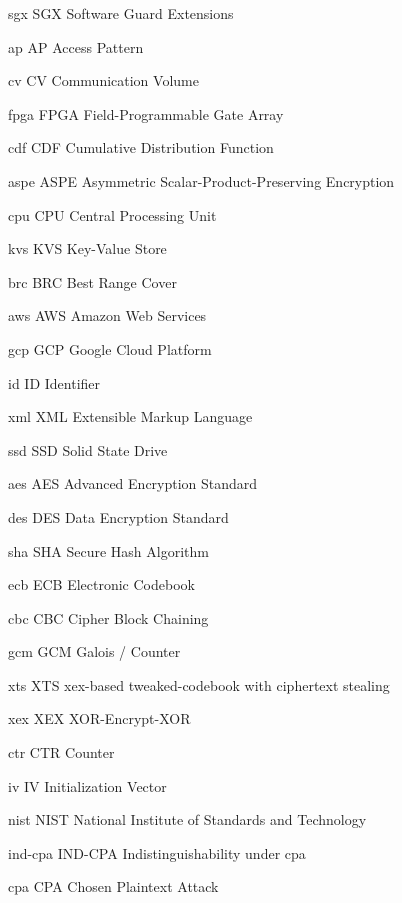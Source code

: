 \newacronym%
	{sgx}
	{SGX}
	{Software Guard Extensions}

\newacronym%
	{ap}
	{AP}
	{Access Pattern}

\newacronym%
	{cv}
	{CV}
	{Communication Volume}

\newacronym%
	{fpga}
	{FPGA}
	{Field-Programmable Gate Array}

\newacronym%
	{cdf}
	{CDF}
	{Cumulative Distribution Function}

\newacronym%
	{aspe}
	{ASPE}
	{Asymmetric Scalar-Product-Preserving Encryption}

\newacronym%
	{cpu}
	{CPU}
	{Central Processing Unit}

\newacronym%
	{kvs}
	{KVS}
	{Key-Value Store}

\newacronym%
	{brc}
	{BRC}
	{Best Range Cover}

\newacronym%
	{aws}
	{AWS}
	{Amazon Web Services}

\newacronym%
	{gcp}
	{GCP}
	{Google Cloud Platform}

\newacronym%
	{id}
	{ID}
	{Identifier}

\newacronym%
	{xml}
	{XML}
	{Extensible Markup Language}

\newacronym%
	{ssd}
	{SSD}
	{Solid State Drive}

\newacronym%
	{aes}
	{AES}
	{Advanced Encryption Standard}

\newacronym%
	{des}
	{DES}
	{Data Encryption Standard}

\newacronym%
	{sha}
	{SHA}
	{Secure Hash Algorithm}

\newacronym%
	{ecb}
	{ECB}
	{Electronic Codebook}

\newacronym%
	{cbc}
	{CBC}
	{Cipher Block Chaining}

\newacronym%
	{gcm}
	{GCM}
	{Galois / Counter}

\newacronym%
	{xts}
	{XTS}
	{\acrshort{xex}-based tweaked-codebook with ciphertext stealing}

\newacronym%
	{xex}
	{XEX}
	{XOR-Encrypt-XOR}

\newacronym%
	{ctr}
	{CTR}
	{Counter}

\newacronym%
	{iv}
	{IV}
	{Initialization Vector}

\newacronym%
	{nist}
	{NIST}
	{National Institute of Standards and Technology}

\newacronym%
	{ind-cpa}
	{IND-CPA}
	{Indistinguishability under \acrlong{cpa}}

\newacronym%
	{cpa}
	{CPA}
	{Chosen Plaintext Attack}

